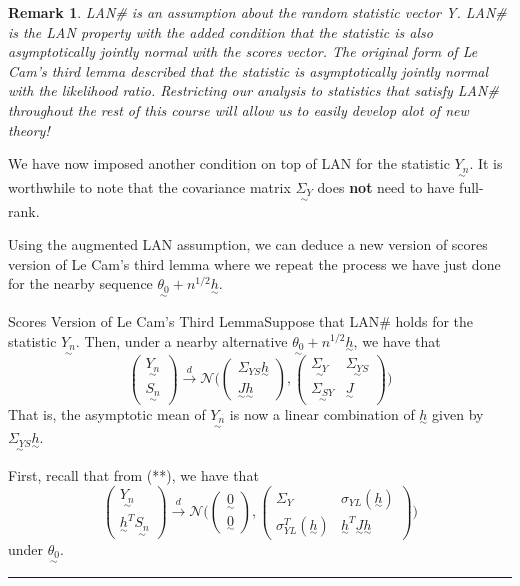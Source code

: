 \documentclass[twoside]{article}
\newtheorem{remark}[theorem]{Remark}
\newenvironment{proof}{{\bf Proof:}}{\hfill\rule{2mm}{2mm}}
\newcommand{\utilde}{\underset{\sim}}
\begin{document}
\begin{remark}LAN\# is an assumption about the random statistic vector Y. LAN\# is the LAN property with the added condition that the statistic is also asymptotically jointly normal with the scores vector. The original form of Le Cam's third lemma described that the statistic is asymptotically jointly normal with the likelihood ratio. Restricting our analysis to statistics that satisfy LAN\# throughout the rest of this course will allow us to easily develop alot of new theory!
\end{remark}

We have now imposed another condition on top of LAN for the statistic $\utilde{Y_n}.$ It is worthwhile to note that the covariance matrix $\utilde{\Sigma_{Y}}$ does \textbf{not} need to have full-rank.


Using the augmented LAN assumption, we can deduce a new version of scores version of Le Cam's third lemma where we repeat the process we have just done for the nearby sequence $\utilde{\theta_0} + n^{1/2}\utilde{h}$.
\begin{proposition_exam}{Scores Version of Le Cam's Third Lemma}{}Suppose that LAN\# holds for the statistic $\utilde{Y_n}.$ Then, under a nearby alternative $\utilde{\theta_0} + n^{1/2}\utilde{h}$, we have that 
$$
\begin{pmatrix}
\utilde{Y_n}\\
\utilde{S_n}
\end{pmatrix}
\xrightarrow{d}
\mathcal{N}\bigg(
\begin{pmatrix}
\Sigma_{YS}\utilde{h}\\
\utilde{J}\utilde{h}
\end{pmatrix}
  ,
\begin{pmatrix}
\utilde{\Sigma_Y} & \utilde{\Sigma_{YS}} \\
\utilde{\Sigma_{SY}} & \utilde{J}
\end{pmatrix}
 \bigg)
$$
That is, the asymptotic mean of $\utilde{Y_n}$ is now a linear combination of $\utilde{h}$ given by $\utilde{\Sigma_{YS}}\utilde{h}$.
\end{proposition_exam}

\begin{proof} First, recall that from (**), we have that 
\begin{equation}
\begin{pmatrix}
\utilde{Y_n}\\
\utilde{h}^T\utilde{S_n}
\end{pmatrix}
 \xrightarrow{d} \mathcal{N}
\bigg( 
\begin{pmatrix}
\utilde{0} \\ \utilde{0}
\end{pmatrix}
,
\begin{pmatrix}
\Sigma_Y & \sigma_{YL}(\utilde{h}) \\
\sigma_{YL}^T(\utilde{h}) & \utilde{h}^T\utilde{J}\utilde{h}
\end{pmatrix}
\bigg)
\tag{**}
\end{equation}
under $\utilde{\theta_0}.$
\end{proof}
\end{document}
